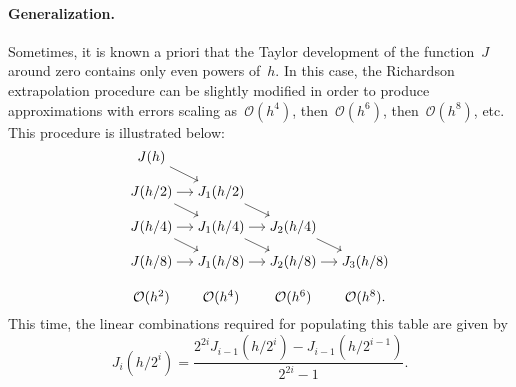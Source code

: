 \paragraph{Generalization.}
Sometimes,
it is known a priori that the Taylor development of the function~$J$ around zero contains only even powers of~$h$.
In this case, the Richardson extrapolation procedure can be slightly modified in order to produce approximations with errors scaling as~$\mathcal O(h^4)$,
then~$\mathcal O(h^6)$, then~$\mathcal O(h^8)$, etc.
This procedure is illustrated below:
\[
    \begin{tikzcd}[cramped, sep=small]
        J(h) \arrow[dr]  \\
        J(h/2) \arrow[r] \arrow[dr] & J_1(h/2) \arrow[dr]  \\
        J(h/4) \arrow[r] \arrow[dr] & J_1(h/4) \arrow[r] \arrow[dr] & J_2(h/4) \arrow[dr]  \\
        J(h/8) \arrow[r] & J_1(h/8) \arrow[r] & J_2(h/8) \arrow[r] & J_3(h/8) \\
        \mathcal O(h^2) & \mathcal O(h^4) & \mathcal O(h^6) & \mathcal O(h^8).
    \end{tikzcd}
\]
This time, the linear combinations required for populating this table are given by
\begin{equation}
    \label{eq:generalized_richardson}
    J_i(h/2^i) = \frac{2^{2i} J_{i-1} (h/2^i) - J_{i-1}(h/2^{i-1})}{2^{2i} - 1}.
\end{equation}

